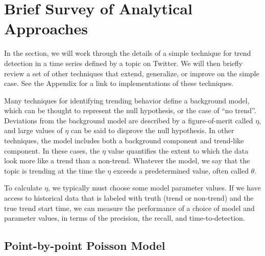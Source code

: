 \documentclass{article}
\begin{document}
\section{Brief Survey of Analytical Approaches}
\label{techniques}

In the section, we will work through the details of a simple technique for
trend detection in a time series defined by a topic on Twitter. We will then briefly
review a set of other techniques that extend, generalize, or improve on the
simple case. See the Appendix for a link to implementations of these
techniques.

Many techniques for identifying trending behavior define a background model,
which can be thought to represent the null hypothesis, or the case of “no
trend”. Deviations from the background model are described by a figure-of-merit
called $\eta$,
and large values of $\eta$ can be said to disprove the null hypothesis. 
In other techniques, the model includes both a background component and
trend-like component. In these cases, the $\eta$ value quantifies the 
extent to which the data look more like a trend than a non-trend. 
Whatever the model, we say that the topic is trending at the time the
$\eta$ exceeds a predetermined value, often called $\theta$. 

To calculate $\eta$, we typically must choose some model parameter values. 
If we have access to historical data that is labeled with truth 
(trend or non-trend) and the true trend start time, we
can measure the performance of a choice of model and parameter values, in terms
of the precision, the recall, and time-to-detection. 

\subsection{Point-by-point Poisson Model}
\label{pbppm}
\end{document}
